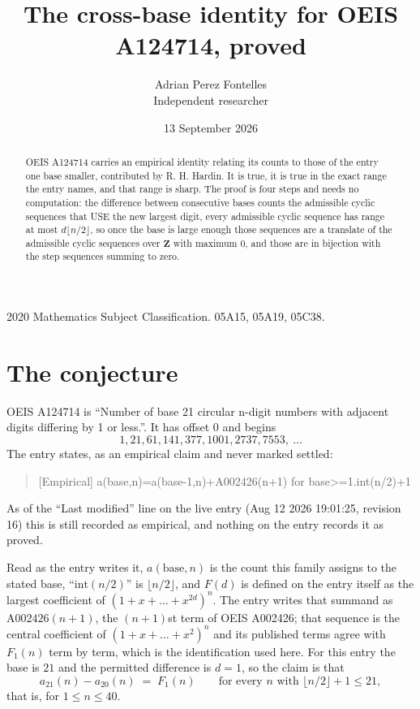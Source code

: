 \documentclass[11pt,a4paper]{article}
\title{The cross-base identity for OEIS A124714, proved}
\author{Adrian Perez Fontelles\\ \small Independent researcher}
\date{13 September 2026}
\theoremstyle{plain}
\theoremstyle{definition}
\begin{document}
\maketitle

\begin{abstract}
OEIS A124714 carries an empirical identity relating its counts to those of the entry one base
smaller, contributed by R. H. Hardin. It is true, it is true in the exact range the entry
names, and that range is sharp. The proof is four steps and needs no computation: the
difference between consecutive bases counts the admissible cyclic sequences that USE the new
largest digit, every admissible cyclic sequence has range at most $d\lfloor n/2\rfloor$, so
once the base is large enough those sequences are a translate of the admissible cyclic
sequences over $\mathbf{Z}$ with maximum $0$, and those are in bijection with the step
sequences summing to zero.
\end{abstract}

\noindent\small 2020 Mathematics Subject Classification. 05A15, 05A19, 05C38.\normalsize

\section{The conjecture}

OEIS A124714 is ``Number of base 21 circular n-digit numbers with adjacent digits differing by 1 or less.''. It has offset $0$ and begins
\[
1, 21, 61, 141, 377, 1001, 2737, 7553,\ \dots
\]
The entry states, as an empirical claim and never marked settled:
\begin{quote}
[Empirical] a(base,n)=a(base-1,n)+A002426(n+1) for base>=1.int(n/2)+1
\end{quote}
As of the ``Last modified'' line on the live entry (Aug 12 2026 19:01:25, revision 16)
this is still recorded as empirical, and nothing on the entry records it as proved.

Read as the entry writes it, $a(\mathrm{base},n)$ is the count this family assigns to the
stated base, ``$\mathrm{int}(n/2)$'' is $\lfloor n/2\rfloor$, and $F(d)$ is defined on the
entry itself as the largest coefficient of $(1+x+\dots+x^{2d})^{n}$. The entry writes that summand as $\mathrm{A002426}(n+1)$, the $(n+1)$st term of OEIS A002426; that sequence is the central coefficient of $(1+x+\dots+x^{2})^{n}$ and its published terms agree with $F_{1}(n)$ term by term, which is the identification used here. For this entry
the base is $21$ and the permitted difference is $d=1$, so the claim is that
\[
a_{21}(n)-a_{20}(n)\;=\;F_{1}(n)
\qquad\text{for every } n \text{ with } \lfloor n/2\rfloor+1\le21,
\]
that is, for $1\le n\le40$.
\end{document}
